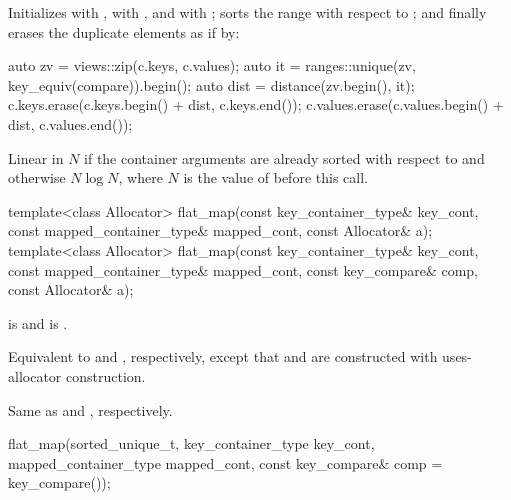 \begin{itemdescr}
\pnum
\effects
Initializes
 with ,
 with , and
 with ;
sorts the range  with respect to ; and
finally erases the duplicate elements as if by:
\begin{codeblock}
auto zv = views::zip(c.keys, c.values);
auto it = ranges::unique(zv, key_equiv(compare)).begin();
auto dist = distance(zv.begin(), it);
c.keys.erase(c.keys.begin() + dist, c.keys.end());
c.values.erase(c.values.begin() + dist, c.values.end());
\end{codeblock}

\pnum
\complexity
Linear in $N$ if the container arguments are already sorted
with respect to  and otherwise $N \log N$,
where $N$ is the value of  before this call.
\end{itemdescr}

%
\begin{itemdecl}
template<class Allocator>
  flat_map(const key_container_type& key_cont, const mapped_container_type& mapped_cont,
           const Allocator& a);
template<class Allocator>
  flat_map(const key_container_type& key_cont, const mapped_container_type& mapped_cont,
           const key_compare& comp, const Allocator& a);
\end{itemdecl}

\begin{itemdescr}
\pnum
\constraints
{} is  and
 is .

\pnum
\effects
Equivalent to  and
, respectively,
except that  and  are constructed with
uses-allocator construction.

\pnum
\complexity
Same as  and
, respectively.
\end{itemdescr}

%
\begin{itemdecl}
flat_map(sorted_unique_t, key_container_type key_cont, mapped_container_type mapped_cont,
         const key_compare& comp = key_compare());
\end{itemdecl}

